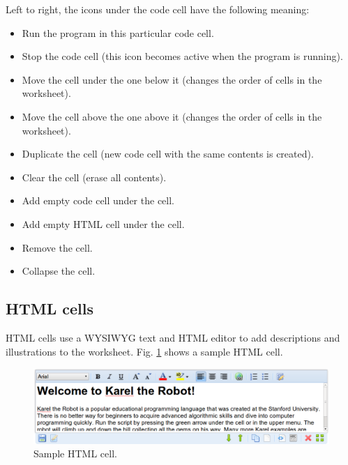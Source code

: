 \noindent
Left to right, the icons under the code cell have the following meaning: 
\begin{itemize}
\item Run the program in this particular code cell.
\item Stop the code cell (this icon becomes active when the program is running).
\item Move the cell under the one below it (changes the order of cells in the worksheet).
\item Move the cell above the one above it (changes the order of cells in the worksheet).
\item Duplicate the cell (new code cell with the same contents is created).
\item Clear the cell (erase all contents).
\item Add empty code cell under the cell.
\item Add empty HTML cell under the cell.
\item Remove the cell.
\item Collapse the cell. 
\end{itemize}

\subsection{HTML cells}

HTML cells use a WYSIWYG text and HTML editor 
to add descriptions and illustrations to the worksheet. Fig. 
\ref{fig:menu-112} shows a sample HTML cell.

\begin{figure}[!ht]
\begin{center}
\includegraphics[width=16cm]{img/menu-113.png}
\vspace{-0mm}
\caption{Sample HTML cell.}
\label{fig:menu-112}
\end{center}
\end{figure}
\noindent

